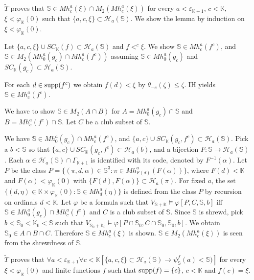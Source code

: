 \documentclass{article}
\newcommand{\mS}{\mathbb{S}}
\newcommand{\mK}{\mathbb{K}}
\begin{document}
\blem\label{lem:welldefinedness.1pi11}
$\tilde{T}$ proves that
$\mathbb{S}\in Mh^{a}_{c}(\xi)\cap M_{2}(Mh^{a}_{c}(\xi))$
for every $a<\varepsilon_{\mathbb{K}+1}$, $c<\mathbb{K}$,
$\xi<\varphi_{\mathbb{K}}(0)$ such that
$\{a,c,\xi\}\subset\mathcal{H}_{a}(\mathbb{S})$.
\elem 
\bprf
We show the lemma by induction on $\xi<\varphi_{\mathbb{K}}(0)$.

Let $\{a,c,\xi\}\cup SC_{\mK}(f)\subset\mathcal{H}_{a}(\mathbb{S})$ and $f<^{c}\xi$.
We show $\mathbb{S}\in Mh^{a}_{c}(f^{c})$, 
and $\mS\in M_{2}\left( Mh_{0}^{a}(g_{c}) \cap Mh^{a}_{c}(f^{c})\right)$
assuming $\mS\in Mh_{0}^{a}(g_{c})$ and $SC_{\mK}(g_{c})\subset\mathcal{H}_{a}(\mS)$.


For each $d\in{\rm supp}(f^{c})$ we obtain $f(d)<\xi$ by 
$\tilde{\theta}_{-e}(\zeta)\leq\zeta$.
IH yields $\mathbb{S}\in Mh^{a}_{c}(f^{c})$.

We have to show $\mathbb{S}\in M_{2}(A\cap B)$ for $A=Mh_{0}^{a}(g_{c})\cap\mathbb{S}$ and 
$B=Mh^{a}_{c}(f^{c})\cap\mathbb{S}$.
Let $C$ be a club subset of $\mathbb{S}$.

We have $\mathbb{S}\in Mh_{0}^{a}(g_{c})\cap Mh^{a}_{c}(f^{c})$,
and
$\{a,c\}\cup SC_{\mK}(g_{c},f^{c})\subset\mathcal{H}_{a}(\mathbb{S})$.
Pick a $b<\mathbb{S}$ so that $\{a,c\}\cup SC_{\mK}(g_{c},f^{c})\subset\mathcal{H}_{a}(b)$, and a bijection 
$F:\mathbb{S}\to \mathcal{H}_{a}(\mathbb{S})$.
Each $\alpha
\in\mathcal{H}_{a}(\mathbb{S})\cap\Gamma_{\mathbb{K}+1}$ is identified with its code, denoted
by $F^{-1}(\alpha)$.
Let $P$ be the class
$P=\{(\pi,d,\alpha)\in\mathbb{S}^{3} : \pi\in Mh^{a}_{F(d)}(F(\alpha))\}$,
where $F(d)<\mathbb{K}$ and $F(\alpha)<\varphi_{\mathbb{K}}(0)$ with $\{F(d),F(\alpha)\}\subset\mathcal{H}_{a}(\pi)$.
For fixed $a$, the set
$\{(d,\eta)\in \mathbb{K}\times\varphi_{\mathbb{K}}(0)   : \mathbb{S}\in Mh^{a}_{d}(\eta)\}$
is defined from the class $P$ by recursion on ordinals $d<\mathbb{K}$.
Let $\varphi$ be a formula such that $V_{\mathbb{S}+\mathbb{K}}\models\varphi[P, C,\mathbb{S},b]$ iff
$\mathbb{S}\in Mh_{0}^{a}(g_{c})\cap Mh^{a}_{c}(f^{c})$ and $C$ is a club subset of $\mathbb{S}$.
Since $\mathbb{S}$ is shrewd, pick $b<\mathbb{S}_{0}<\mathbb{K}_{0}<\mathbb{S}$ such that
$V_{\mathbb{S}_{0}+\mathbb{K}_{0}}\models\varphi[P\cap \mathbb{S}_{0},C\cap\mathbb{S}_{0},\mathbb{S}_{0},b]$.
We obtain $\mathbb{S}_{0}\in A\cap B\cap C$.
Therefore $\mathbb{S}\in Mh^{a}_{c}(\xi)$ is shown.
$\mathbb{S}\in M_{2}(Mh^{a}_{c}(\xi))$ is seen from the shrewdness of 
$\mathbb{S}$.
\eprf


\bcor\label{cor:welldefinedness.1}
$\tilde{T}$ proves that
$\forall a<\varepsilon_{\mathbb{K}+1}\forall c<\mathbb{K}[\{a,c,\xi\}\subset\mathcal{H}_{a}(\mathbb{S}) \to \psi_{\mathbb{S}}^{f}(a)<\mathbb{S})]$
for every $\xi<\varphi_{\mathbb{K}}(0)$ and finite functions 
$f$ such that ${\rm supp}(f)=\{c\}$, $c<\mathbb{K}$ and
$f(c)=\xi$.
\ecor
\end{document}
